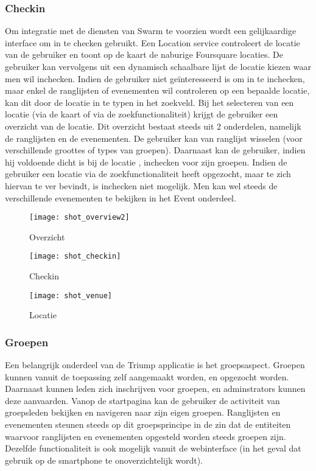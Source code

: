 \subsubsection{Checkin}%
Om integratie met de diensten van Swarm te voorzien wordt een gelijkaardige interface om in te checken gebruikt. Een Location service controleert de locatie van de gebruiker en toont op de kaart de naburige Foursquare locaties. De gebruiker kan vervolgens uit een dynamisch schaalbare lijst de locatie kiezen waar men wil inchecken. Indien de gebruiker niet geïnteresseerd is om in te inchecken, maar enkel de ranglijsten of evenementen wil controleren op een bepaalde locatie, kan dit door de locatie in te typen in het zoekveld. Bij het selecteren van een locatie (via de kaart of via de zoekfunctionaliteit) krijgt de gebruiker een overzicht van de locatie. Dit overzicht bestaat steeds uit 2 onderdelen, namelijk de ranglijsten en de evenementen. De gebruiker kan van ranglijst wisselen (voor verschillende groottes of types van groepen). Daarnaast kan de gebruiker, indien hij voldoende dicht is bij de locatie , inchecken voor zijn groepen. Indien de gebruiker een locatie via de zoekfunctionaliteit heeft opgezocht, maar te zich hiervan te ver bevindt, is inchecken niet mogelijk. Men kan wel steeds  de verschillende evenementen te bekijken in het Event onderdeel.
\begin{figure}[ht]
\begin{minipage}[b]{0.25\linewidth}
\centering
\texttt{[image: shot\_overview2]}
\caption{Overzicht}
\label{fig:screenshot_overview2}
\end{minipage}
\hspace{1.5cm}
\begin{minipage}[b]{0.25\linewidth}
\centering
\texttt{[image: shot\_checkin]}
\caption{Checkin}
\label{fig:screenshot_checkin}
\end{minipage}
\hspace{1.5cm}
\begin{minipage}[b]{0.25\linewidth}
\centering
\texttt{[image: shot\_venue]}
\caption{Locatie}
\label{fig:screenshot_venue}
\end{minipage}
\end{figure}
\clearpage
\subsubsection{Groepen}%
Een belangrijk onderdeel van de Triump applicatie is het groepsaspect. Groepen kunnen vanuit de toepassing zelf aangemaakt worden, en opgezocht worden. Daarnaast kunnen leden zich inschrijven voor groepen, en adminstrators kunnen deze aanvaarden. Vanop de startpagina kan de gebruiker de activiteit van groepsleden bekijken en navigeren naar zijn eigen groepen. Ranglijsten en evenementen steunen steeds op dit groepsprincipe in de zin dat de entiteiten waarvoor ranglijsten en evenementen opgesteld worden steeds groepen zijn. Dezelfde functionaliteit is ook mogelijk vanuit de webinterface (in het geval dat gebruik op de smartphone te onoverzichtelijk wordt).


